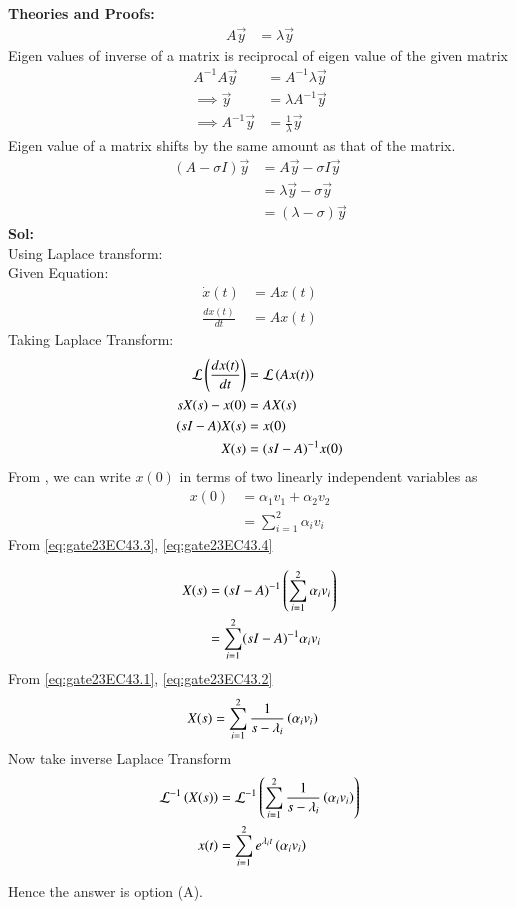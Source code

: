 \documentclass[journal,12pt,onecolumn]{IEEEtran}
\theoremstyle{remark}
\begin{document}
\textbf{Theories and Proofs:} \\
\begin{align}
A\vec{y} &= \lambda \vec{y} 
\end{align}
Eigen values of inverse of a matrix is reciprocal of eigen value of the given matrix\\
\begin{align}
A^{-1}A\vec{y} &= A^{-1}\lambda \vec{y} \\ \implies
\vec{y} &= \lambda A^{-1}\vec{y}  \\ \implies
A^{-1} \vec{y} &= \frac{1}{\lambda}\vec{y} \label{eq:gate23EC43.1}
\end{align}
Eigen value of a matrix shifts by the same amount as that of the matrix.\\
\begin{align}
(A - \sigma I)\vec{y} &= A\vec{y} - \sigma I\vec{y} \\
&= \lambda \vec{y} - \sigma \vec{y} \\
&= (\lambda - \sigma) \vec{y} \label{eq:gate23EC43.2}
\end{align}
\textbf{Sol:} \\
Using Laplace transform: \\
Given Equation:
\begin{align}
\dot{{x}}(t) &= A{x}(t) \\
\frac{d{x}(t)}{dt} &= A{x}(t) 
\end{align}
Taking Laplace Transform:
\begin{align}
\mathcal{L}\brak{\frac{d{x}(t)}{dt}} &= \mathcal{L}\brak{A{x}(t)} \\
sX(s) - {x}(0) &= AX(s) \\
(sI - A)X(s) &= x(0) \\
X(s) &= (sI - A)^{-1}{x}(0) \label{eq:gate23EC43.3}
\end{align}
From , we can write $x(0)$ in terms of two linearly independent variables as 
\begin{align}
    x(0) &= \alpha_1v_1 + \alpha_2v_2 \\
    &= \sum_{i=1}^{2}\alpha_iv_i \label{eq:gate23EC43.4}
\end{align}
From \eqref{eq:gate23EC43.3}, \eqref{eq:gate23EC43.4}

\begin{align}
 X(s) &= (sI - A)^{-1}\left(\sum_{i=1}^{2}\alpha_iv_i\right) \\
 &= \sum_{i=1}^{2}(sI - A)^{-1}\alpha_iv_i
\end{align}
From \eqref{eq:gate23EC43.1}, \eqref{eq:gate23EC43.2}
\begin{align}
X(s) &=  \sum_{i=1}^{2}\frac{1}{s-\lambda_i}\left(\alpha_iv_i\right) 
\end{align}
Now take inverse Laplace Transform
\begin{align}
\mathcal{L}^{-1}\left(X(s)\right) &= \mathcal{L}^{-1}\left(\sum_{i=1}^{2}\frac{1}{s-\lambda_i}\left(\alpha_iv_i\right)\right) \\
{x}(t) &= \sum_{i=1}^{2} e^{\lambda_it}\left(\alpha_iv_i\right) 
\end{align}

Hence the answer is option (A).
\end{document}
